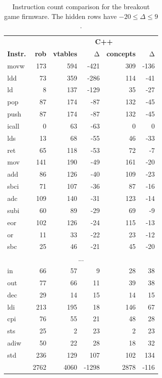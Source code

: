 \documentclass[10pt,sigplan,screen,anonymous]{acmart}
\begin{document}
\begin{table}[t]
\caption{Instruction count comparison for the breakout game firmware. The hidden rows have $-20 \le \Delta \le 9$.}\vspace{-8pt}
\label{tb:mnemonicscount}
\begin{tabular}{lrrrrr}
\toprule
& & \multicolumn{4}{c}{\bf C++} \\
\cmidrule{3-6}
\bf Instr. & \bf rob & \bf vtables & Δ & \bf concepts & Δ \\
\midrule
movw & 173 & 594 & -421 & 309 & -136 \\
ldd & 73 & 359 & -286 & 114 & -41 \\
ld & 8 & 137 & -129 & 35 & -27 \\
pop & 87 & 174 & -87 & 132 & -45 \\
push & 87 & 174 & -87 & 132 & -45 \\
icall & 0 & 63 & -63 & 0 & 0 \\
lds & 13 & 68 & -55 & 46 & -33 \\
ret & 65 & 118 & -53 & 72 & -7 \\
mov & 141 & 190 & -49 & 161 & -20 \\
add & 86 & 126 & -40 & 109 & -23 \\
sbci & 71 & 107 & -36 & 87 & -16 \\
adc & 109 & 140 & -31 & 123 & -14 \\
subi & 60 & 89 & -29 & 69 & -9 \\
eor & 102 & 126 & -24 & 115 & -13 \\
or & 11 & 33 & -22 & 23 & -12 \\
sbc & 25 & 46 & -21 & 45 & -20 \\
\multicolumn{6}{c}{...} \\
in & 66 & 57 & 9 & 28 & 38 \\
out & 77 & 66 & 11 & 39 & 38 \\
dec & 29 & 14 & 15 & 14 & 15 \\
ldi & 213 & 195 & 18 & 146 & 67 \\
cpi & 76 & 55 & 21 & 48 & 28 \\
sts & 25 & 2 & 23 & 2 & 23 \\
adiw & 50 & 22 & 28 & 18 & 32 \\
std & 236 & 129 & 107 & 102 & 134 \\
\midrule
 & 2762 & 4060 & -1298 & 2878 & -116 \\
\bottomrule
\end{tabular}
\end{table}
\end{document}

